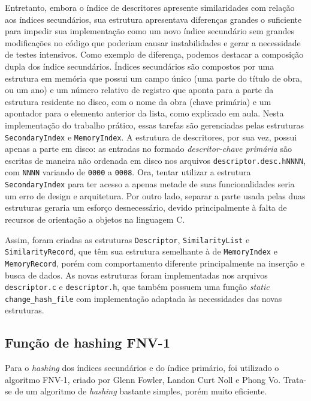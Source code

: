 \documentclass[a4paper,10pt]{article}
\begin{document}
Entretanto, embora o índice de descritores apresente similaridades com relação aos índices secundários, sua estrutura apresentava diferenças grandes o suficiente para impedir sua implementação como um novo índice secundário sem grandes modificações no código que poderiam causar instabilidades e gerar a necessidade de testes intensivos. Como exemplo de diferença, podemos destacar a composição dupla dos índice secundários. Índices secundários são compostos por uma estrutura em memória que possui um campo único (uma parte do título de obra, ou um ano) e um número relativo de registro que aponta para a parte da estrutura residente no disco, com o nome da obra (chave primária) e um apontador para o elemento anterior da lista, como explicado em aula. Nesta implementação do trabalho prático, essas tarefas são gerenciadas pelas estruturas \texttt{SecondaryIndex} e \texttt{MemoryIndex}. A estrutura de descritores, por sua vez, possui apenas a parte em disco: as entradas no formado \textit{descritor-chave primária} são escritas de maneira não ordenada em disco nos arquivos \texttt{descriptor.desc.hNNNN}, com \texttt{NNNN} variando de \texttt{0000} a \texttt{0008}. Ora, tentar utilizar a estrutura \texttt{SecondaryIndex} para ter acesso a apenas metade de suas funcionalidades seria um erro de design e arquitetura. Por outro lado, separar a parte usada pelas duas estruturas geraria um esforço desnecessário, devido principalmente à falta de recursos de orientação a objetos na linguagem C.

Assim, foram criadas as estruturas \texttt{Descriptor}, \texttt{SimilarityList} e \texttt{SimilarityRecord}, que têm sua estrutura semelhante à de \texttt{MemoryIndex} e \texttt{MemoryRecord}, porém com comportamento diferente principalmente na inserção e busca de dados. As novas estruturas foram implementadas nos arquivos \texttt{descriptor.c} e \texttt{descriptor.h}, que também possuem uma função \textit{static} \texttt{change\_hash\_file} com implementação adaptada às necessidades das novas estruturas.

\subsection{Função de hashing FNV-1}\label{fnv1}
Para o \textit{hashing} dos índices secundários e do índice primário, foi utilizado o algoritmo FNV-1, criado por Glenn Fowler, Landon Curt Noll e Phong Vo\cite{fnv1ref,fnv1wiki}. Trata-se de um algoritmo de \textit{hashing} bastante simples, porém muito eficiente.
\end{document}
